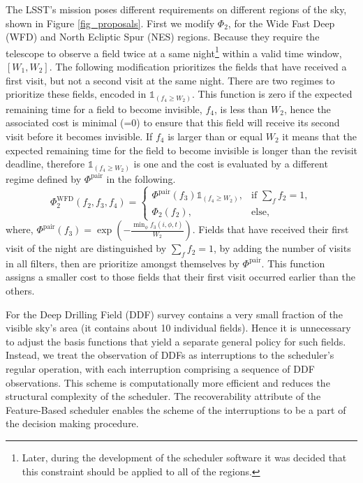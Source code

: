 \documentclass[12pt]{aastex62}
\theoremstyle{definition}
\begin{document}
The LSST's mission poses different requirements on different regions of the sky, shown in Figure \ref{fig_proposals}. First we modify $\Phi_2$, for the Wide Fast Deep (WFD) and North Ecliptic Spur (NES) regions. Because they require the telescope to observe a field twice at a same night\footnote{Later, during the development of the scheduler software it was decided that this constraint should be applied to all of the regions.} within a valid time window, $[W_1,W_2]$. The following modification prioritizes the fields that have received a first visit, but not a second visit at the same night. There are two regimes to prioritize these fields, encoded in $\mathds{1}_{(f_4 \geq W_2)}$. This function is zero if the expected remaining time for a field to become invisible, $f_4$, is less than $W_2$, hence the associated cost is minimal (=0) to ensure that this field will receive its second visit before it becomes invisible. If $f_4$ is larger than or equal $W_2$ it means that the expected remaining time for the field to become invisible is longer than the revisit deadline, therefore $\mathds{1}_{(f_4 \geq W_2)}$ is one and the cost is evaluated by a different regime defined by $\Phi^{\text{pair}}$ in the following.
%
\begin{equation*}
\Phi_2^{\text{WFD}}(f_2,f_3,f_4) =\begin{cases} \Phi^{\text{pair}}(f_3) \mathds{1}_{(f_4 \geq W_2)},& \text{if } \sum\limits_{f}{f_2} = 1,\\ \Phi_2(f_2),& \text{else,} \end{cases}
\end{equation*}
%
where, $\Phi^{\text{pair}}(f_3) = \exp(- \frac{\min_{\phi}f_3(i,\phi,t)}{W_2})$. Fields that have received their first visit of the night are distinguished by $\sum\limits_{f}{f_2} = 1$, by adding the number of visits in all filters, then are prioritize amongst themselves by $\Phi^{\text{pair}}$. This function assigns a smaller cost to those fields that their first visit occurred earlier than the others.

For the Deep Drilling Field (DDF) survey contains a very small fraction of the visible sky's area (it contains about 10 individual fields). Hence it is unnecessary to adjust the basis functions that yield a separate general policy for such fields. Instead, we treat the observation of DDFs as interruptions to the scheduler's regular operation, with each interruption comprising a sequence of DDF observations. This scheme is computationally more efficient and reduces the structural complexity of the scheduler. The recoverability attribute of the Feature-Based scheduler enables the scheme of the interruptions to be a part of the decision making procedure.
\end{document}

